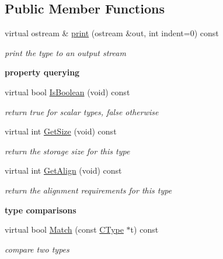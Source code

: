 \subsection*{Public Member Functions}
\begin{DoxyCompactItemize}
\item 
virtual ostream \& \hyperlink{classCBoolType_a2f16cb8a4c8637b154d6f20997199d24}{print} (ostream \&out, int indent=0) const 
\begin{DoxyCompactList}\small\item\em print the type to an output stream \end{DoxyCompactList}\end{DoxyCompactItemize}
\begin{Indent}{\bf property querying}\par
\begin{DoxyCompactItemize}
\item 
\hypertarget{classCBoolType_a07d69e3fc5786834d02661054b889310}{virtual bool \hyperlink{classCBoolType_a07d69e3fc5786834d02661054b889310}{Is\-Boolean} (void) const }\label{classCBoolType_a07d69e3fc5786834d02661054b889310}

\begin{DoxyCompactList}\small\item\em return {\itshape true} for scalar types, {\itshape false} otherwise \end{DoxyCompactList}\item 
virtual int \hyperlink{classCBoolType_a18098410443811161474c1a2d227909d}{Get\-Size} (void) const 
\begin{DoxyCompactList}\small\item\em return the storage size for this type \end{DoxyCompactList}\item 
virtual int \hyperlink{classCBoolType_a2ce1a6a6d4dd623ce04e71ffa26bb69a}{Get\-Align} (void) const 
\begin{DoxyCompactList}\small\item\em return the alignment requirements for this type \end{DoxyCompactList}\end{DoxyCompactItemize}
\end{Indent}
\begin{Indent}{\bf type comparisons}\par
\begin{DoxyCompactItemize}
\item 
virtual bool \hyperlink{classCBoolType_aeb34c6d76a1ac7af08094a8aa4c5da4c}{Match} (const \hyperlink{classCType}{C\-Type} $\ast$t) const 
\begin{DoxyCompactList}\small\item\em compare two types \end{DoxyCompactList}\end{DoxyCompactItemize}
\end{Indent}
